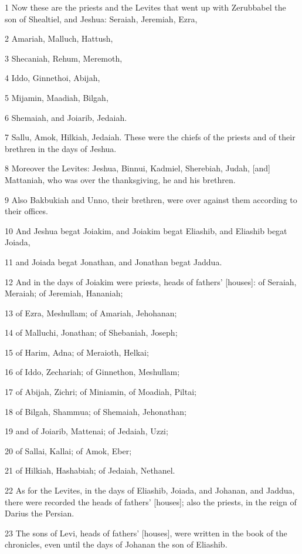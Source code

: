 \par 1 Now these are the priests and the Levites that went up with Zerubbabel the son of Shealtiel, and Jeshua: Seraiah, Jeremiah, Ezra,
\par 2 Amariah, Malluch, Hattush,
\par 3 Shecaniah, Rehum, Meremoth,
\par 4 Iddo, Ginnethoi, Abijah,
\par 5 Mijamin, Maadiah, Bilgah,
\par 6 Shemaiah, and Joiarib, Jedaiah.
\par 7 Sallu, Amok, Hilkiah, Jedaiah. These were the chiefs of the priests and of their brethren in the days of Jeshua.
\par 8 Moreover the Levites: Jeshua, Binnui, Kadmiel, Sherebiah, Judah, [and] Mattaniah, who was over the thanksgiving, he and his brethren.
\par 9 Also Bakbukiah and Unno, their brethren, were over against them according to their offices.
\par 10 And Jeshua begat Joiakim, and Joiakim begat Eliashib, and Eliashib begat Joiada,
\par 11 and Joiada begat Jonathan, and Jonathan begat Jaddua.
\par 12 And in the days of Joiakim were priests, heads of fathers' [houses]: of Seraiah, Meraiah; of Jeremiah, Hananiah;
\par 13 of Ezra, Meshullam; of Amariah, Jehohanan;
\par 14 of Malluchi, Jonathan; of Shebaniah, Joseph;
\par 15 of Harim, Adna; of Meraioth, Helkai;
\par 16 of Iddo, Zechariah; of Ginnethon, Meshullam;
\par 17 of Abijah, Zichri; of Miniamin, of Moadiah, Piltai;
\par 18 of Bilgah, Shammua; of Shemaiah, Jehonathan;
\par 19 and of Joiarib, Mattenai; of Jedaiah, Uzzi;
\par 20 of Sallai, Kallai; of Amok, Eber;
\par 21 of Hilkiah, Hashabiah; of Jedaiah, Nethanel.
\par 22 As for the Levites, in the days of Eliashib, Joiada, and Johanan, and Jaddua, there were recorded the heads of fathers' [houses]; also the priests, in the reign of Darius the Persian.
\par 23 The sons of Levi, heads of fathers' [houses], were written in the book of the chronicles, even until the days of Johanan the son of Eliashib.
